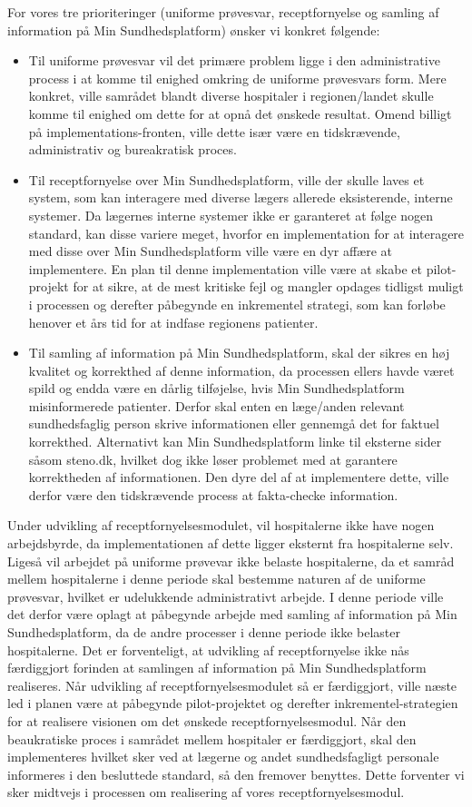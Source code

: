 For vores tre prioriteringer (uniforme prøvesvar, receptfornyelse og samling af information på Min Sundhedsplatform) ønsker vi konkret følgende:
\begin{itemize}
	\item Til uniforme prøvesvar vil det primære problem ligge i den administrative process i at komme til enighed omkring de uniforme prøvesvars form. Mere konkret, ville samrådet blandt diverse hospitaler i regionen/landet skulle komme til enighed om dette for at opnå det ønskede resultat. Omend billigt på implementations-fronten, ville dette især være en tidskrævende, administrativ og bureakratisk proces. 
	\item Til receptfornyelse over Min Sundhedsplatform, ville der skulle laves et system, som kan interagere med diverse lægers allerede eksisterende, interne systemer. Da lægernes interne systemer ikke er garanteret at følge nogen standard, kan disse variere meget, hvorfor en implementation for at interagere med disse over Min Sundhedsplatform ville være en dyr affære at implementere. En plan til denne implementation ville være at skabe et pilot-projekt for at sikre, at de mest kritiske fejl og mangler opdages tidligst muligt i processen og derefter påbegynde en inkrementel strategi, som kan forløbe henover et års tid for at indfase regionens patienter.   
	\item Til samling af information på Min Sundhedsplatform, skal der sikres en høj kvalitet og korrekthed af denne information, da processen ellers havde været spild og endda være en dårlig tilføjelse, hvis Min Sundhedsplatform misinformerede patienter. Derfor skal enten en læge/anden relevant sundhedsfaglig person skrive informationen eller gennemgå det for faktuel korrekthed. Alternativt kan Min Sundhedsplatform linke til eksterne sider såsom steno.dk, hvilket dog ikke løser problemet med at garantere korrektheden af informationen. Den dyre del af at implementere dette, ville derfor være den tidskrævende process at fakta-checke information. 
\end{itemize}
Under udvikling af receptfornyelsesmodulet, vil hospitalerne ikke have nogen arbejdsbyrde, da implementationen af dette ligger eksternt fra hospitalerne selv. Ligeså vil arbejdet på uniforme prøvevar ikke belaste hospitalerne, da et samråd mellem hospitalerne i denne periode skal bestemme naturen af de uniforme prøvesvar, hvilket er udelukkende administrativt arbejde. I denne periode ville det derfor være oplagt at påbegynde arbejde med samling af information på Min Sundhedsplatform, da de andre processer i denne periode ikke belaster hospitalerne. Det er forventeligt, at udvikling af receptfornyelse ikke nås færdiggjort forinden at samlingen af information på Min Sundhedsplatform realiseres. Når udvikling af receptfornyelsesmodulet så er færdiggjort, ville næste led i planen være at påbegynde pilot-projektet og derefter inkrementel-strategien for at realisere visionen om det ønskede receptfornyelsesmodul.
Når den beaukratiske proces i samrådet mellem hospitaler er færdiggjort, skal den implementeres hvilket sker ved at lægerne og andet sundhedsfagligt personale informeres i den besluttede standard, så den fremover benyttes. Dette forventer vi sker midtvejs i processen om realisering af vores receptfornyelsesmodul.